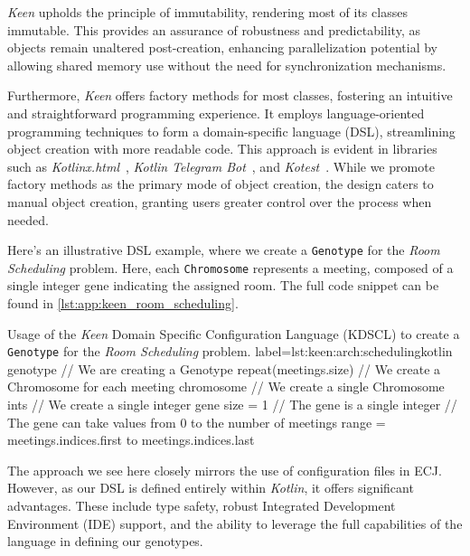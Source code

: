   \textit{Keen} upholds the principle of immutability, rendering most of its
  classes immutable.
  This provides an assurance of robustness and predictability, as objects remain
  unaltered post-creation, enhancing parallelization potential by allowing
  shared memory use without the need for synchronization mechanisms.

  Furthermore, \textit{Keen} offers factory methods for most classes, fostering 
  an intuitive and straightforward programming experience.
  It employs language-oriented programming techniques to form a domain-specific 
  language (DSL), streamlining object creation with more readable code.
  This approach is evident in libraries such as 
  \textit{Kotlinx.html}~\autocite{KotlinxHtml2023}, 
  \textit{Kotlin Telegram Bot}~\autocite{KotlinTelegramBot2023}, and 
  \textit{Kotest}~\autocite{KotestKotesta}.
  While we promote factory methods as the primary mode of object creation, the 
  design caters to manual object creation, granting users greater control over 
  the process when needed.


  Here's an illustrative DSL example, where we create a \texttt{Genotype} for
  the \textit{Room Scheduling} problem.
  Here, each \texttt{Chromosome} represents a meeting, composed of a single
  integer gene indicating the assigned room. The full code snippet can be found 
  in \vref{lst:app:keen_room_scheduling}.

  \begin{code}{
      Usage of the \textit{Keen} Domain Specific Configuration Language 
      (KDSCL) to create a \texttt{Genotype} for the \textit{Room
      Scheduling} problem.
  }{label={lst:keen:arch:scheduling}}{kotlin}
      genotype {                  // We are creating a Genotype
          repeat(meetings.size) { // We create a Chromosome for each meeting
              chromosome {        // We create a single Chromosome
                  ints {          // We create a single integer gene
                      size = 1    // The gene is a single integer
                      // The gene can take values from 0 to the number of meetings
                      range = meetings.indices.first to meetings.indices.last
                  }
              }
          }
      }
  \end{code}

  The approach we see here closely mirrors the use of configuration files in 
  ECJ.
  However, as our DSL is defined entirely within \textit{Kotlin}, it offers 
  significant advantages.
    These include type safety, robust Integrated Development Environment (IDE) 
    support, and the ability to leverage the full capabilities of the language 
    in defining our genotypes.

